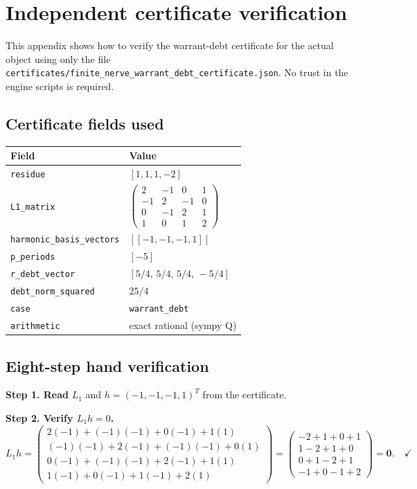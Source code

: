 \documentclass[11pt]{article}
\begin{document}



\appendix
\section{Independent certificate verification}
\label{app:verify}

This appendix shows how to verify the warrant-debt certificate for the actual
object using only the file \texttt{certificates/finite\_nerve\_warrant\_debt\_certificate.json}.
No trust in the engine scripts is required.

\subsection*{Certificate fields used}
\begin{center}
\begin{tabular}{ll}
\toprule
Field & Value \\
\midrule
\texttt{residue} & $[1,1,1,-2]$ \\
\texttt{L1\_matrix} & $\begin{pmatrix}2&-1&0&1\\-1&2&-1&0\\0&-1&2&1\\1&0&1&2\end{pmatrix}$ \\
\texttt{harmonic\_basis\_vectors} & $[[-1,-1,-1,1]]$ \\
\texttt{p\_periods} & $[-5]$ \\
\texttt{r\_debt\_vector} & $[5/4,\,5/4,\,5/4,\,-5/4]$ \\
\texttt{debt\_norm\_squared} & $25/4$ \\
\texttt{case} & \texttt{warrant\_debt} \\
\texttt{arithmetic} & exact rational (sympy Q) \\
\bottomrule
\end{tabular}
\end{center}

\subsection*{Eight-step hand verification}

\textbf{Step 1. Read} $L_1$ and $h=(-1,-1,-1,1)^T$ from the certificate.

\textbf{Step 2. Verify $L_1 h = 0$.}
\[
L_1 h =
\begin{pmatrix}
2(-1)+(-1)(-1)+0(-1)+1(1) \\
(-1)(-1)+2(-1)+(-1)(-1)+0(1) \\
0(-1)+(-1)(-1)+2(-1)+1(1) \\
1(-1)+0(-1)+1(-1)+2(1)
\end{pmatrix}
=
\begin{pmatrix}
-2+1+0+1\\1-2+1+0\\0+1-2+1\\-1+0-1+2
\end{pmatrix}
=\mathbf{0}. \quad\checkmark
\]
\end{document}
